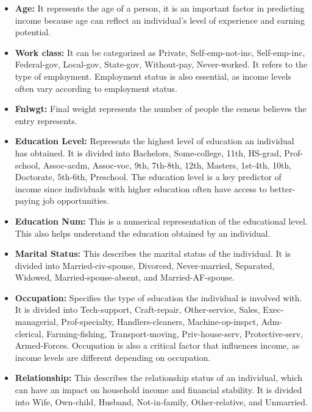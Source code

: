 \documentclass[10pt,journal,compsoc]{IEEEtran}
\begin{document}
\begin{itemize}
    \item \textbf{Age:} It represents the age of a person, it is an important factor in predicting income because age can reflect an individual's level of experience and earning potential.

    \item \textbf{Work class:} It can be categorized as Private, Self-emp-not-inc, Self-emp-inc, Federal-gov, Local-gov, State-gov, Without-pay, Never-worked. It refers to the type of employment. Employment status is also essential, as income levels often vary according to employment status.

    \item \textbf{Fnlwgt:} Final weight represents the number of people the census believes the entry represents.

    \item \textbf{Education Level:} Represents the highest level of education an individual has obtained. It is divided into Bachelors, Some-college, 11th, HS-grad, Prof-school, Assoc-acdm, Assoc-voc, 9th, 7th-8th, 12th, Masters, 1st-4th, 10th, Doctorate, 5th-6th, Preschool. The education level is a key predictor of income since individuals with higher education often have access to better-paying job opportunities.

    \item \textbf{Education Num:} This is a numerical representation of the educational level. This also helps understand the education obtained by an individual.

    \item \textbf{Marital Status:} This describes the marital status of the individual. It is divided into Married-civ-spouse, Divorced, Never-married, Separated, Widowed, Married-spouse-absent, and Married-AF-spouse.

    \item \textbf{Occupation:} Specifies the type of education the individual is involved with. It is divided into Tech-support, Craft-repair, Other-service, Sales, Exec-managerial, Prof-specialty, Handlers-cleaners, Machine-op-inspct, Adm-clerical, Farming-fishing, Transport-moving, Priv-house-serv, Protective-serv, Armed-Forces. Occupation is also a critical factor that influences income, as income levels are different depending on occupation.

    \item \textbf{Relationship:} This describes the relationship status of an individual, which can have an impact on household income and financial stability. It is divided into Wife, Own-child, Husband, Not-in-family, Other-relative, and Unmarried.


\end{itemize}
\end{document}
